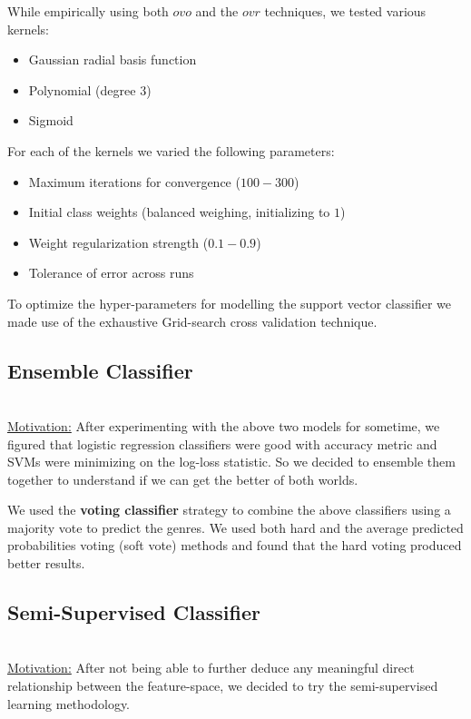 \documentclass[fleqn,10pt]{SelfArx} %
\begin{document}
While empirically using both $ovo$ and the $ovr$ techniques, we tested various kernels:
\begin{itemize}
  \item Gaussian radial basis function
  \item Polynomial (degree 3)
  \item Sigmoid
\end{itemize}

For each of the kernels we varied the following parameters:
\begin{itemize}
  \item Maximum iterations for convergence ($100-300$)
  \item Initial class weights (balanced weighing, initializing to $1$)
  \item Weight regularization strength ($0.1-0.9$)
  \item Tolerance of error across runs
\end{itemize}

To optimize the hyper-parameters for modelling the support vector classifier we made use of the exhaustive Grid-search cross validation technique.
\subsection{Ensemble Classifier}~\\
\underline{Motivation:} After experimenting with the above two models for sometime, we figured that logistic regression classifiers were good with accuracy metric and SVMs were minimizing on the log-loss statistic. So we decided to ensemble them together to understand if we can get the better of both worlds.

We used the \textbf{voting classifier} strategy to combine the above classifiers using a majority vote to predict the genres. We used both hard and the average predicted probabilities voting (soft vote) methods and found that the hard voting produced better results.

\subsection{Semi-Supervised Classifier}~\\

\underline{Motivation:} After not being able to further deduce any meaningful direct relationship between the feature-space, we decided to try the semi-supervised learning methodology.
\end{document}
